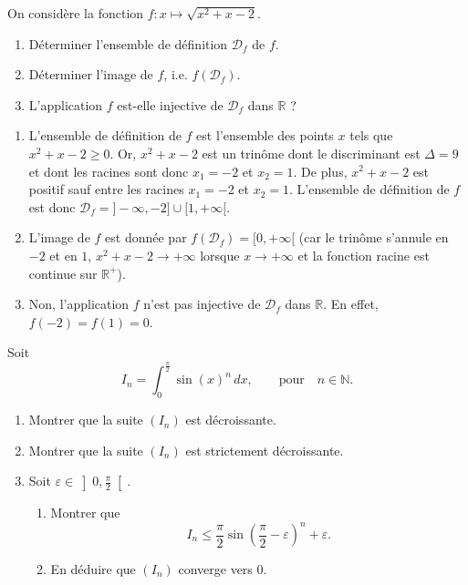 \documentclass[a4paper, 11pt,openany]{book}%
\newtheorem[L]{thm}{Théorème}[section]
\newtheorem[M]{propo}[thm]{Proposition}
\newtheorem[M]{prop}[thm]{Propriété}
\newtheorem[M]{coro}[thm]{Corollaire}
\newtheorem[M]{lem}[thm]{Lemme}
\newtheorem[M,bodystyle=]{defi}[thm]{Définition}
\newtheorem[M,bodystyle=]{remark}[thm]{Remarque}
\newtheorem[M,bodystyle=]{met}[thm]{Méthode}
\newtheorem[M,bodystyle=]{ret}[thm]{A retenir}
\newtheorem[M,bodystyle=]{idee}[thm]{Idée}
\newtheorem[style=S,underline=false,bodystyle=]{exem}[thm]{Exemple}
\newtheorem[S,underline=false,bodystyle=]{exo}[thm]{Exercice}
\newtheorem[S,underline=false,bodystyle=]{appli}[thm]{Application}
\newtheorem[S,underline=false,bodystyle=]{sol}[thm]{Solution}
\newtheorem[S,underline=false,bodystyle=]{hypo}[thm]{Hypothesis}
\newtheorem[S,underline=false,bodystyle=]{nota}[thm]{Notation}
\newcommand{\R}{\mathbb{R}}
\newcommand{\calD}{\mathcal{D}}
\begin{document}
\begin{exo}
On considère la fonction 
$ f : x \mapsto \sqrt{x^2 + x - 2}$.
\begin{enumerate}
\item Déterminer l'ensemble de définition $\calD_f$ de $f$.
\item Déterminer l'image de $f$, i.e. $f(\calD_f)$.
\item L'application $f$ est-elle injective de $\calD_f$ dans $\R$ ?
\end{enumerate}
\end{exo}


\begin{sol}
\begin{enumerate}
\item L'ensemble de définition de $f$ est l'ensemble des points $x$ tels que $x^2 + x -2 \geqslant 0$. Or, $x^2 + x -2$ est un trinôme dont le discriminant est $\Delta = 9$ et dont les racines sont donc $x_1 = -2$ et $x_2 =1$. De plus, $x^2 +x -2$ est positif sauf entre les racines $x_1 = -2$ et $x_2= 1$. L'ensemble de définition de $f$ est donc $\calD_f = ]-\infty,-2] \cup [1, +\infty[$.
\item L'image de $f$ est donnée par $f(\calD_f) = [0,+\infty[$ (car le trinôme s'annule en $-2$ et en $1$, $x^2+x-2 \to + \infty$ lorsque $x \to + \infty$ et la fonction racine est continue sur $\R^+$).
\item Non, l'application $f$ n'est pas injective de $\calD_f$ dans $\R$. En effet, $f(-2) =  f(1)= 0$.
\end{enumerate}
\end{sol}





\begin{exo}

Soit 
\[ I_n= \int_0^{\frac{\pi}{2}} \sin(x)^n \, dx, \quad \quad \text{pour} \quad n\in \mathbb{N}.\]
\begin{enumerate}
\item Montrer que la suite $(I_n)$ est décroissante.
\item Montrer que la suite $(I_n)$ est strictement décroissante.
\item Soit $\varepsilon \in \left] 0 ,\frac{\pi}{2} \right[$. \begin{enumerate}
\item  Montrer que 
\[ I_n \leqslant \frac{\pi}{2} \sin \left( \frac{\pi}{2} - \varepsilon \right)^n + \varepsilon.\]
\item En déduire que $(I_n)$ converge vers $0$.
\end{enumerate}
\end{enumerate}

\end{exo}
\end{document}
